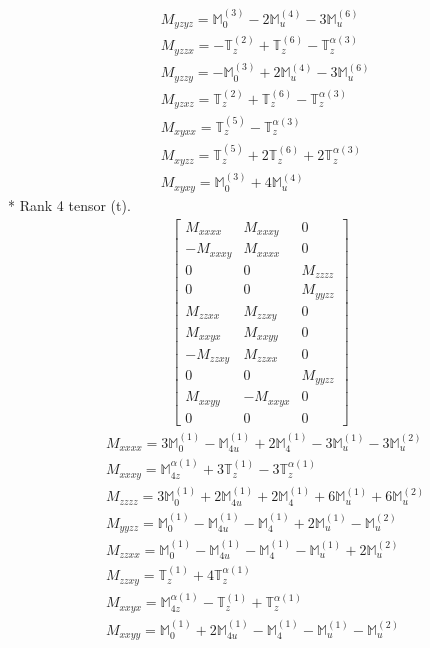 \documentclass[fleqn,8pt,landscape]{jsarticle}
\begin{document}
\begin{align*}
& M_{yzyz} = \mathbb{M}_{0}^{(3)} - 2 \mathbb{M}_{u}^{(4)} - 3 \mathbb{M}_{u}^{(6)} \\
& M_{yzzx} = - \mathbb{T}_{z}^{(2)} + \mathbb{T}_{z}^{(6)} - \mathbb{T}_{z}^{\alpha(3)} \\
& M_{yzzy} = - \mathbb{M}_{0}^{(3)} + 2 \mathbb{M}_{u}^{(4)} - 3 \mathbb{M}_{u}^{(6)} \\
& M_{yzxz} = \mathbb{T}_{z}^{(2)} + \mathbb{T}_{z}^{(6)} - \mathbb{T}_{z}^{\alpha(3)} \\
& M_{xyxx} = \mathbb{T}_{z}^{(5)} - \mathbb{T}_{z}^{\alpha(3)} \\
& M_{xyzz} = \mathbb{T}_{z}^{(5)} + 2 \mathbb{T}_{z}^{(6)} + 2 \mathbb{T}_{z}^{\alpha(3)} \\
& M_{xyxy} = \mathbb{M}_{0}^{(3)} + 4 \mathbb{M}_{u}^{(4)}
\end{align*}
* Rank 4 tensor (t).
\begin{align*}
\begin{bmatrix} M_{xxxx} & M_{xxxy} & 0 \\ - M_{xxxy} & M_{xxxx} & 0 \\ 0 & 0 & M_{zzzz} \\ 0 & 0 & M_{yyzz} \\ M_{zzxx} & M_{zzxy} & 0 \\ M_{xxyx} & M_{xxyy} & 0 \\ - M_{zzxy} & M_{zzxx} & 0 \\ 0 & 0 & M_{yyzz} \\ M_{xxyy} & - M_{xxyx} & 0 \\ 0 & 0 & 0 \end{bmatrix}
\end{align*}
\begin{align*}
& M_{xxxx} = 3 \mathbb{M}_{0}^{(1)} - \mathbb{M}_{4u}^{(1)} + 2 \mathbb{M}_{4}^{(1)} - 3 \mathbb{M}_{u}^{(1)} - 3 \mathbb{M}_{u}^{(2)} \\
& M_{xxxy} = \mathbb{M}_{4z}^{\alpha(1)} + 3 \mathbb{T}_{z}^{(1)} - 3 \mathbb{T}_{z}^{\alpha(1)} \\
& M_{zzzz} = 3 \mathbb{M}_{0}^{(1)} + 2 \mathbb{M}_{4u}^{(1)} + 2 \mathbb{M}_{4}^{(1)} + 6 \mathbb{M}_{u}^{(1)} + 6 \mathbb{M}_{u}^{(2)} \\
& M_{yyzz} = \mathbb{M}_{0}^{(1)} - \mathbb{M}_{4u}^{(1)} - \mathbb{M}_{4}^{(1)} + 2 \mathbb{M}_{u}^{(1)} - \mathbb{M}_{u}^{(2)} \\
& M_{zzxx} = \mathbb{M}_{0}^{(1)} - \mathbb{M}_{4u}^{(1)} - \mathbb{M}_{4}^{(1)} - \mathbb{M}_{u}^{(1)} + 2 \mathbb{M}_{u}^{(2)} \\
& M_{zzxy} = \mathbb{T}_{z}^{(1)} + 4 \mathbb{T}_{z}^{\alpha(1)} \\
& M_{xxyx} = \mathbb{M}_{4z}^{\alpha(1)} - \mathbb{T}_{z}^{(1)} + \mathbb{T}_{z}^{\alpha(1)} \\
& M_{xxyy} = \mathbb{M}_{0}^{(1)} + 2 \mathbb{M}_{4u}^{(1)} - \mathbb{M}_{4}^{(1)} - \mathbb{M}_{u}^{(1)} - \mathbb{M}_{u}^{(2)}
\end{align*}
\end{document}
